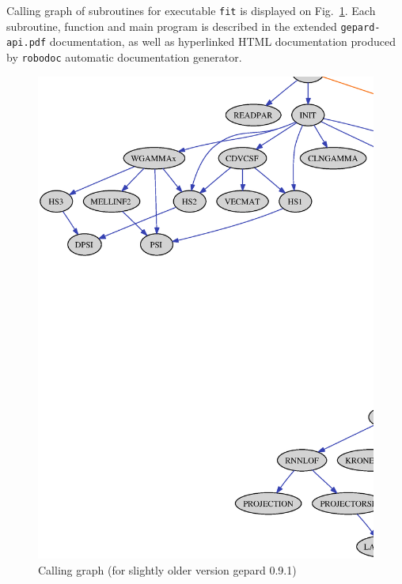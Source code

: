 \documentclass[12pt]{article}
\begin{document}
Calling graph of subroutines for executable \texttt{fit} is displayed on
Fig.~\ref{fig:callgraph}. Each subroutine,
function and main program is described in the extended \texttt{gepard-api.pdf} documentation,
as well as hyperlinked HTML documentation produced by \texttt{robodoc} automatic
documentation generator.

\begin{figure}[ht]
\begin{center}
\includegraphics[scale=0.52]{callgraph}
\end{center}
\caption{Calling graph (for slightly older version gepard 0.9.1)}
\label{fig:callgraph}
\end{figure}




%

%

\end{document}
